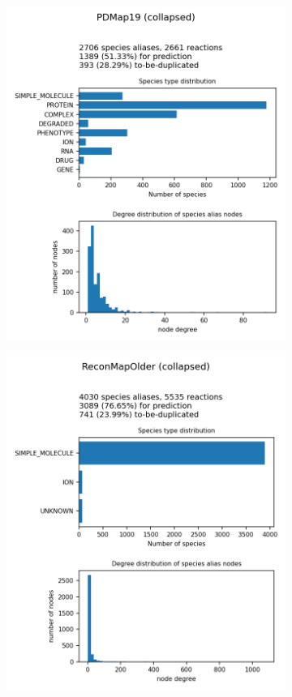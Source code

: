 \documentclass[
	fontsize=10pt, %
	twoside=false, %
	secnumdepth=1, %
]{kaobook}
\begin{document}
\begin{figure}[h]
\begin{subfigure}{0.32\textwidth}
    \includegraphics[width=\linewidth]{generated/PDMap19.png}
  \end{subfigure} 
  \begin{subfigure}{0.32\textwidth}
    \includegraphics[width=\linewidth]{generated/ReconMapOlder.png}

\end{subfigure}
\end{figure}
\end{document}
